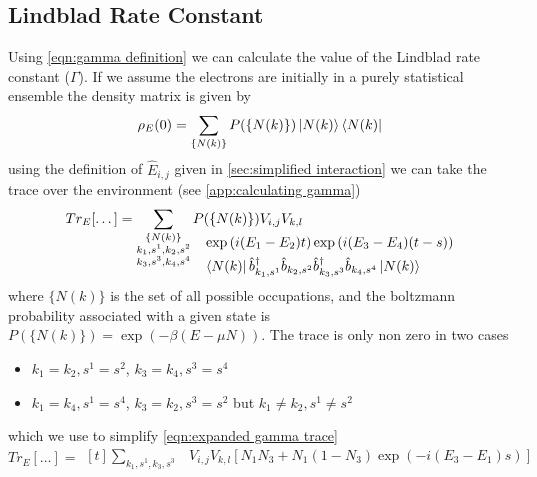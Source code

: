 \subsection{Lindblad Rate Constant}
Using \cref{eqn:gamma definition}
we can calculate the value of
the Lindblad rate constant (\(\Gamma \)).
If we assume the electrons
are initially in a purely
statistical ensemble the
density matrix is given
by\cite{sakurai_napolitano_2020}
\begin{equation}
    \rho_E(0) = \sum_{\{N(k)\}}
    P(\{N(k)\})
    \ket{N(k)} \bra{N(k)}
\end{equation}
using the definition
of \(\hat{E}_{i,j}\) given
in \cref{sec:simplified interaction}
we can
take the trace over the
environment (see \cref{app:calculating gamma})
\begin{equation}
    Tr_E[\dots]  = \begin{aligned}[t]
        \sum_{\substack{\{N(k)\}                              \\
        k_1,s^1,k_2,s^2                                       \\
                k_3,s^3,k_4,s^4 }}
        P & (\{N(k)\}) V_{i,j} V_{k,l}                        \\[-28pt]
          & \exp{(i(E_1 - E_2) t)} \exp{(i(E_3 - E_4) (t-s))} \\
          & \bra{N(k)}
        \hat{b}_{k_1,s^1}^\dagger{} \hat{b}_{k_2,s^2}
        \hat{b}_{k_3,s^3}^\dagger{} \hat{b}_{k_4,s^4}
        \ket{N(k)}
    \end{aligned}\label{eqn:expanded gamma trace}
\end{equation}
where \( \{N(k)\} \) is the set of
all possible occupations, and
the boltzmann
probability associated with a
given state is
\(P(\{N(k)\}) = \exp{(-\beta{}(E-\mu N))}\).
The trace is only non zero in two
cases
\begin{itemize}
    \item \(k_1=k_2, s^1=s^2\),
          \(k_3=k_4, s^3=s^4\)
    \item \(k_1=k_4, s^1=s^4\),
          \(k_3=k_2, s^3=s^2\) but
          \(k_1\neq{}k_2, s^1\neq{}s^2\)
\end{itemize}
which we use to simplify \cref{eqn:expanded gamma trace}
\begin{equation}
    Tr_E[\dots] = \begin{aligned}[t]
        \sum_{k_1,s^1,k_3,s^3 }
         & V_{i,j} V_{k,l} [
                N_1 N_3
                + N_1 (1 - N_3) \exp{(-i(E_3 - E_1)s)}]
    \end{aligned}
\end{equation}
